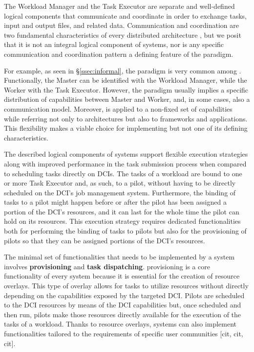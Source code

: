\documentclass{sig-alternate}
\begin{document}
The Workload Manager and the Task Executor are separate and
well-defined logical components that communicate and coordinate in
order to exchange tasks, input and output files, and related
data. Communication and coordination are two fundamental
characteristics of every distributed architecture , but we posit that it is not an integral logical
component of \pilotjob systems, nor is any specific communication and
coordination pattern a defining feature of the \pilotjob paradigm.

For example, as seen in \S\ref{ssec:informal}, the \MW paradigm is
very common among \pilotjobs. Functionally, the Master can be
identified with the Workload Manager, while the Worker with the Task
Executor. However, the \MW paradigm usually implies a specific
distribution of capabilities between Master and Worker, and, in some
cases, also a communication model. Moreover, \MW is applied to a
non-fixed set of capabilities while referring not only to
architectures but also to frameworks and applications. This flexibility makes \MW a viable choice for
implementing \pilotjobs but not one of its defining characteristics.

The described logical components of \pilotjob systems support flexible
execution strategies along with improved performance in the task
submission process when compared to scheduling tasks directly on
DCIs. The tasks of a workload are bound to one or more Task Executor
and, as such, to a pilot, without having to be directly scheduled on
the DCI's job management system.  Furthermore, the binding of tasks to
a pilot might happen before or after the pilot has been assigned a
portion of the DCI's resources, and it can last for the whole time the
pilot can hold on its resources. This execution strategy requires
dedicated functionalities both for performing the binding of tasks to
pilots but also for the provisioning of pilots so that they can be
assigned portions of the DCI's resources.

The minimal set of functionalities that needs to be implemented by a
\pilotjob system involves \textbf{\pilot provisioning} and
\textbf{task dispatching}.   \pilot provisioning is a core functionality of every
\pilot system because it is essential for the creation of resource
overlays. This type of overlay allows for tasks to utilize resources
without directly depending on the capabilities exposed by the targeted
DCI. Pilots are scheduled to the DCI resources by means of the DCI
capabilities but, once scheduled and then run, pilots make those
resources directly available for the execution of the tasks of a
workload.  Thanks to resource overlays, \pilot systems can also
implement functionalities tailored to the requirements of specific
user communities [cit, cit, cit].
\end{document}
